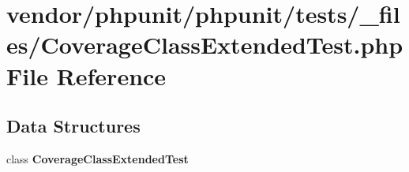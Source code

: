 \section{vendor/phpunit/phpunit/tests/\+\_\+files/\+Coverage\+Class\+Extended\+Test.php File Reference}
\label{phpunit_2tests_2__files_2_coverage_class_extended_test_8php}
\subsection*{Data Structures}
\begin{DoxyCompactItemize}
\item 
class {\bf Coverage\+Class\+Extended\+Test}
\end{DoxyCompactItemize}
